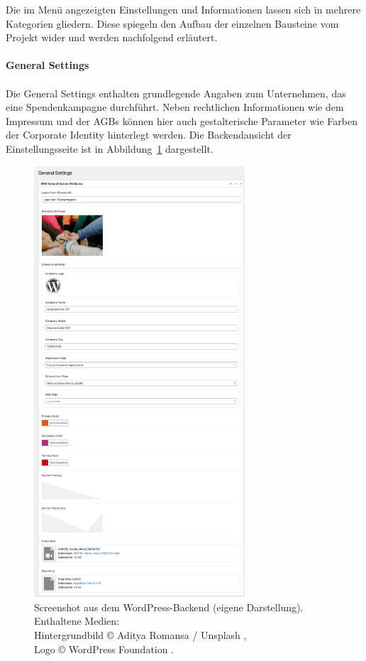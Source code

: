 Die im Menü angezeigten Einstellungen und Informationen lassen sich in mehrere Kategorien gliedern.
Diese spiegeln den Aufbau der einzelnen Bausteine vom Projekt wider und werden nachfolgend erläutert.
\\\\
\textbf{General Settings}\\\\
Die General Settings enthalten grundlegende Angaben zum Unternehmen, das eine Spendenkampagne durchführt.
Neben rechtlichen Informationen wie dem Impressum und der AGBs können hier auch gestalterische Parameter wie Farben der Corporate Identity hinterlegt werden.
Die Backendansicht der Einstellungsseite ist in Abbildung~\ref{fig:charigame-general-settings-legacy} dargestellt.
\begin{figure}[H]
    \centering
    \includegraphics[width=0.7\textwidth]{images/legacy_general_settings}
    \caption{Screenshot aus dem WordPress-Backend (eigene Darstellung).\\
    Enthaltene Medien:\\Hintergrundbild © Aditya Romansa / Unsplash \cite{unsplash_romansa_babyhand},\\
    Logo © WordPress Foundation \cite{wordpresslogo}.}
    \label{fig:charigame-general-settings-legacy}
\end{figure}


